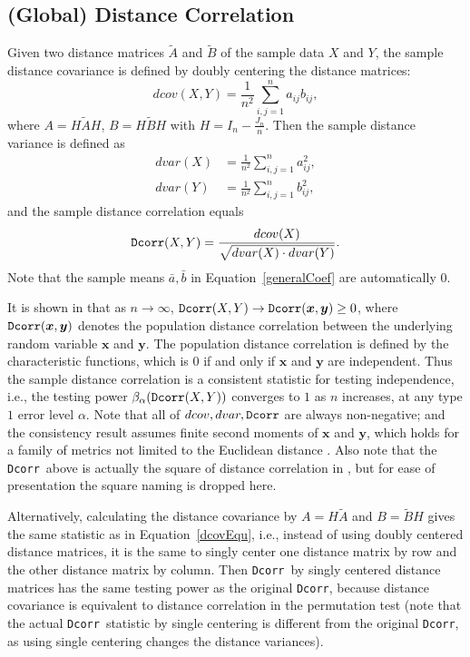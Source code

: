 \documentclass[11pt]{article}
\providecommand{\sct}[1]{{\sc \texttt{#1}}}
\providecommand{\mb}[1]{\boldsymbol{#1}}
\newcommand{\Dcorr}{\sct{Dcorr}}
\begin{document}
\subsection{(Global) Distance Correlation}
\label{appen:dcorr}
Given two distance matrices $\tilde{A}$ and $\tilde{B}$ of the sample data $X$ and $Y$, the sample distance covariance is defined by doubly centering the distance matrices:
\begin{equation}
\label{dcovEqu}
dcov(X,Y)=\frac{1}{n^2}\sum_{i,j=1}^{n}a_{ij}b_{ij},
\end{equation}
where $A=H\tilde{A}H$, $B=H\tilde{B}H$ with $H=I_{n}-\frac{J_{n}}{n}$. Then the sample distance variance is defined as
\begin{align*}
dvar(X) &=\frac{1}{n^2}\sum_{i,j=1}^{n}a_{ij}^{2},\\
dvar(Y) &=\frac{1}{n^2}\sum_{i,j=1}^{n}b_{ij}^{2},
\end{align*}
and the sample distance correlation equals
\begin{equation}
\label{dcorrEqu}
\Dcorr(X,Y)=\frac{dcov(X)}{\sqrt{dvar(X) \cdot dvar(Y)}}.
\end{equation}
Note that the sample means $\bar{a}, \bar{b}$ in Equation~\ref{generalCoef} are automatically $0$.

It is shown in \cite{SzekelyRizzoBakirov2007} that as $n \rightarrow \infty$, $\Dcorr(X,Y) \rightarrow \Dcorr(\mb{x},\mb{y}) \geq 0$, where $\Dcorr(\mb{x},\mb{y})$ denotes the population distance correlation between the underlying random variable $\mb{x}$ and $\mb{y}$. The population distance correlation is defined by the characteristic functions, which is $0$ if and only if $\mb{x}$ and $\mb{y}$ are independent. Thus the sample distance correlation is a consistent statistic for testing independence, i.e., the testing power $\beta_{\alpha}(\Dcorr(X,Y))$ converges to $1$ as $n$ increases, at any type $1$ error level $\alpha$. Note that all of $dcov, dvar, \Dcorr$ are always non-negative; and the consistency result assumes finite second moments of $\mb{x}$ and $\mb{y}$, which holds for a family of metrics not limited to the Euclidean distance \cite{Lyons2013}. Also note that the \Dcorr~above is actually the square of distance correlation in \cite{SzekelyRizzoBakirov2007}, but for ease of presentation the square naming is dropped here.

Alternatively, calculating the distance covariance by $A=H\tilde{A}$ and $B=\tilde{B}H$ gives the same statistic as in Equation~\ref{dcovEqu}, i.e., instead of using doubly centered distance matrices, it is the same to singly center one distance matrix by row and the other distance matrix by column. Then \Dcorr~by singly centered distance matrices has the same testing power as the original \Dcorr, because distance covariance is equivalent to distance correlation in the permutation test (note that the actual \Dcorr~statistic by single centering is different from the original \Dcorr, as using single centering changes the distance variances).
\end{document}
